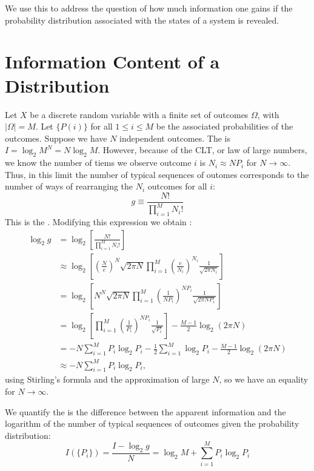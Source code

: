 \documentclass[12pt, a4paper, oneside, openright, titlepage]{book}
\begin{document}
We use this to address the question of how much information one gains if the probability distribution associated with the states of a system is revealed.

\section{Information Content of a Distribution}

Let $X$ be a discrete random variable with a finite set of outcomes $\Omega$, with $|\Omega| = M$. Let $\{P(i)\}$ for all $1 \leq i \leq M$ be the associated probabilities of the outcomes. Suppose we have $N$ independent outcomes. The  is $I = \log_2M^N = N\log_2M$. However, because of the CLT, or law of large numbers, we know the number of tiems we observe outcome $i$ is $N_i \approx NP_i$ for $N\rightarrow \infty$. Thus, in this limit the number of typical sequences of outomes corresponds to the number of ways of rearranging the $N_i$ outcomes for all $i$: \begin{equation*}
    g \equiv \frac{N!}{\prod_{i=1}^MN_i!}
\end{equation*}
This is the . Modifying this expression we obtain : \begin{align*}
    \log_2g &= \log_2\left[\frac{N!}{\prod_{i=1}^MN_i!}\right] \\
    &\approx \log_2\left[\left(\frac{N}{e}\right)^N\sqrt{2\pi N}\prod_{i=1}^M\left(\frac{e}{N_i}\right)^{N_i}\frac{1}{\sqrt{2\pi N_i}}\right] \\
    &= \log_2\left[N^N\sqrt{2\pi N}\prod_{i=1}^M\left(\frac{1}{NP_i}\right)^{NP_i}\frac{1}{\sqrt{2\pi NP_i}}\right] \\
    &= \log_2\left[\prod_{i=1}^M\left(\frac{1}{P_i}\right)^{NP_i}\frac{1}{\sqrt{P_i}}\right] - \frac{M-1}{2}\log_2(2\pi N) \\
    &= -N\sum_{i=1}^MP_i\log_2P_i - \frac{1}{2}\sum_{i=1}^M\log_2P_i - \frac{M-1}{2}\log_2(2\pi N)\\
    &\approx -N\sum_{i=1}^MP_i\log_2P_i,
\end{align*}
using Stirling's formula and the approximation of large $N$, so we have an equality for $N\rightarrow \infty$.

\begin{defn}
    We quantify the  is the difference between the apparent information and the logarithm of the number of typical sequences of outcomes given the probability distribution: \begin{equation*}
        I(\{P_i\}) = \frac{I-\log_2g}{N} = \log_2M + \sum_{i=1}^MP_i\log_2P_i
    \end{equation*}
\end{defn}
\end{document}
